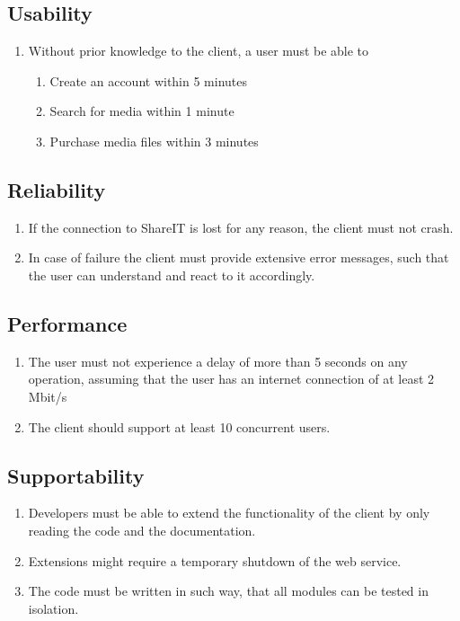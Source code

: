 \documentclass[../report.tex]{subfiles}
\begin{document}
\subsection{Usability}

\begin{enumerate}[label=U\arabic*:]
\item Without prior knowledge to the client, a user must be able to
	\begin{enumerate}
	\item{Create an account within 5 minutes}
	\item Search for media within 1 minute
	\item Purchase media files within 3 minutes
	\end{enumerate}
\end{enumerate}

\subsection{Reliability}

\begin{enumerate}[label=R\arabic*:]
\item If the connection to ShareIT is lost for any reason, the client must not crash. 
\item In case of failure the client must provide extensive error messages, such that the user can understand and react to it accordingly.
\end{enumerate}

\subsection{Performance}

\begin{enumerate}[label=P\arabic*:]
\item The user must not experience a delay of more than 5 seconds on any operation, assuming that the user has an internet connection of at least 2 Mbit/s
\item The client should support at least 10 concurrent users. 
\end{enumerate}

\subsection{Supportability}

\begin{enumerate}[label=S\arabic*:]
\item Developers must be able to extend the functionality of the client by only reading the code and the documentation.
\item Extensions might require a temporary shutdown of the web service.
\item The code must be written in such way, that all modules can be tested in isolation.
\end{enumerate}
\end{document}
